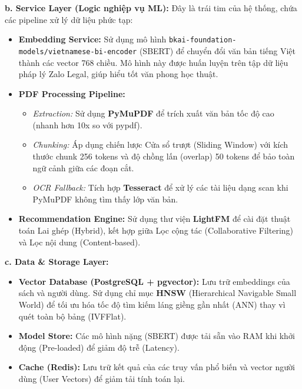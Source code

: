 \textbf{b. Service Layer (Logic nghiệp vụ ML):}
Đây là trái tim của hệ thống, chứa các pipeline xử lý dữ liệu phức tạp:
\begin{itemize}
\item \textbf{Embedding Service:} Sử dụng mô hình \texttt{bkai-foundation-models/vietnamese-bi-encoder} (SBERT) để chuyển đổi văn bản tiếng Việt thành các vector 768 chiều. Mô hình này được huấn luyện trên tập dữ liệu pháp lý Zalo Legal, giúp hiểu tốt văn phong học thuật.
\item \textbf{PDF Processing Pipeline:}
\begin{itemize}
\item \textit{Extraction:} Sử dụng \textbf{PyMuPDF} để trích xuất văn bản tốc độ cao (nhanh hơn 10x so với pypdf).
\item \textit{Chunking:} Áp dụng chiến lược Cửa sổ trượt (Sliding Window) với kích thước chunk 256 tokens và độ chồng lấn (overlap) 50 tokens để bảo toàn ngữ cảnh giữa các đoạn cắt.
\item \textit{OCR Fallback:} Tích hợp \textbf{Tesseract} để xử lý các tài liệu dạng scan khi PyMuPDF không tìm thấy lớp văn bản.
\end{itemize}
\item \textbf{Recommendation Engine:} Sử dụng thư viện \textbf{LightFM} để cài đặt thuật toán Lai ghép (Hybrid), kết hợp giữa Lọc cộng tác (Collaborative Filtering) và Lọc nội dung (Content-based).
\end{itemize}
\textbf{c. Data \& Storage Layer:}
\begin{itemize}
\item \textbf{Vector Database (PostgreSQL + pgvector):} Lưu trữ embeddings của sách và người dùng. Sử dụng chỉ mục \textbf{HNSW} (Hierarchical Navigable Small World) để tối ưu hóa tốc độ tìm kiếm láng giềng gần nhất (ANN) thay vì quét toàn bộ bảng (IVFFlat).
\item \textbf{Model Store:} Các mô hình nặng (SBERT) được tải sẵn vào RAM khi khởi động (Pre-loaded) để giảm độ trễ (Latency).
\item \textbf{Cache (Redis):} Lưu trữ kết quả của các truy vấn phổ biến và vector người dùng (User Vectors) để giảm tải tính toán lại.
\end{itemize}


